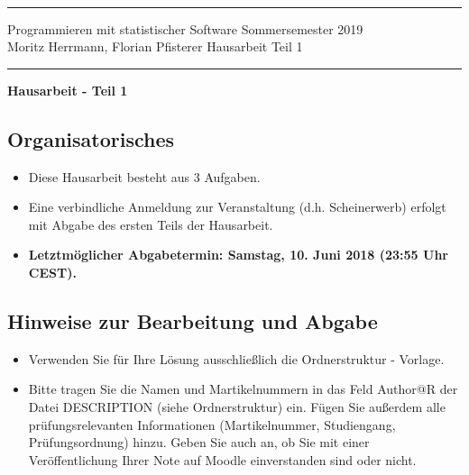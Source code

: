 \documentclass[a4paper]{article}
\begin{document}
  \sloppy \thispagestyle{empty} \setlength{\parindent}{0cm}
  \rule{0cm}{0cm}
  \vspace{-3.8cm}\\

  {\hrule \vspace{.2cm} {\sfbold Programmieren mit statistischer Software}\hfill
    {\sfbold Sommersemester 2019}\\
    {\sfbold Moritz Herrmann, Florian Pfisterer}\hfill {\sfbold
      Hausarbeit Teil 1}


    \vspace{.2cm} \hrule \vspace{1.5cm}

    \begin{center}
      {\bf \LARGE Hausarbeit - Teil 1}
    \end{center}

    \subsection*{Organisatorisches}
    \begin{itemize}
      \item Diese Hausarbeit besteht aus {3 Aufgaben}.
      \item Eine verbindliche Anmeldung zur Veranstaltung (d.h. Scheinerwerb) erfolgt mit Abgabe des ersten Teils der Hausarbeit.
      \item {\bf Letztmöglicher Abgabetermin: Samstag, 10. Juni 2018 (23:55 Uhr CEST).}\\
    \end{itemize}

    \subsection*{Hinweise zur Bearbeitung und Abgabe}

    \begin{itemize}
      \item Verwenden Sie für Ihre Lösung ausschließlich die Ordnerstruktur - Vorlage.

      \item Bitte tragen Sie die Namen und Martikelnummern in das Feld Author@R der Datei DESCRIPTION (siehe Ordnerstruktur) ein.
       Fügen Sie außerdem alle prüfungsrelevanten Informationen (Martikelnummer, Studiengang, Prüfungsordnung) hinzu.
       Geben Sie auch an, ob Sie mit einer Veröffentlichung Ihrer Note auf Moodle einverstanden sind oder nicht.


\end{itemize}}
\end{document}
